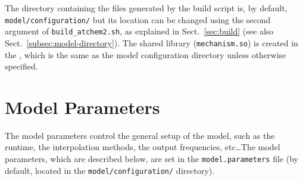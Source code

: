 The directory containing the files generated by the build script is,
by default, \texttt{model/configuration/} but its location can be changed
using the second argument of \texttt{build\_atchem2.sh}, as explained
in Sect.~\ref{sec:build} (see also Sect.~\ref{subsec:model-directory}).
The shared library (\texttt{mechanism.so}) is created in the
\sharedir, which is the same as the model configuration directory
unless otherwise specified.

\section{Model Parameters} \label{sec:model-parameters}

The model parameters control the general setup of the model, such as
the runtime, the interpolation methods, the output frequencies,
etc\ldots The model parameters, which are described below, are set in
the \texttt{model.parameters} file (by default, located in the
\texttt{model/configuration/} directory).

